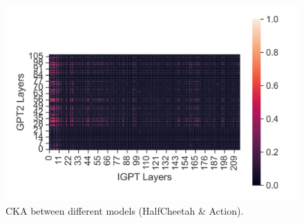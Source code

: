 \documentclass{article}
\begin{document}
\begin{figure}[H]
\begin{minipage}[b]{0.32\linewidth}
        \includegraphics[width=\linewidth]{figs/cka_40_40_gpt2igpt_halfcheetah_medium_666_action.png}
    \end{minipage}
    \caption{CKA between different models (HalfCheetah \& Action).}
\end{figure}
\end{document}
